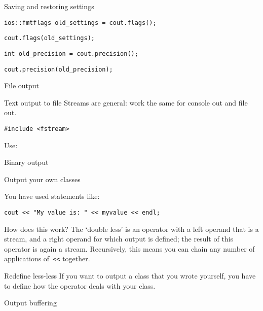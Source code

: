  {Saving and restoring settings}

\begin{verbatim}
ios::fmtflags old_settings = cout.flags();
\end{verbatim}

\begin{verbatim}
cout.flags(old_settings);
\end{verbatim}

\begin{verbatim}
int old_precision = cout.precision();
\end{verbatim}

\begin{verbatim}
cout.precision(old_precision);
\end{verbatim}

 {File output}

\begin{block}{Text output to file}
  \label{sl:io-file}
Streams are general: work the same for console out and file out.
\begin{verbatim}
#include <fstream>
\end{verbatim}
Use:
\end{block}

\begin{block}{Binary output}
  \label{sl:io-bin}
\end{block}


 {Output your own classes}
\label{sec:lessless}

You have used statements like:
\begin{verbatim}
cout << "My value is: " << myvalue << endl;
\end{verbatim}
How does this work? The `double less' is an operator with a left
operand that is a stream, and a right operand for which output is
defined; the result of this operator is again a stream. Recursively,
this means you can chain any number of applications of~\verb+<<+
together.

\begin{block}{Redefine less-less}
  \label{sl:lessless-def}
  If you want to output a class that you wrote yourself, you have to
  define how the \n{<<} operator deals with your class.

\end{block}

 {Output buffering}

